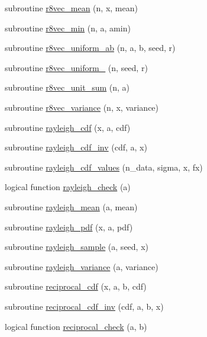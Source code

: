 \begin{DoxyCompactItemize}
\item 
subroutine \hyperlink{subroutines_8f_a3afb0bc60d390433659934e42be314b5}{r8vec\+\_\+mean} (n, x, mean)
\item 
subroutine \hyperlink{subroutines_8f_a5068c55b384e4d8de2b97c2ac9fb9f23}{r8vec\+\_\+min} (n, a, amin)
\item 
subroutine \hyperlink{subroutines_8f_a34c59b6daeb8820b723412d8d9bdf687}{r8vec\+\_\+uniform\+\_\+ab} (n, a, b, seed, r)
\item 
subroutine \hyperlink{subroutines_8f_a5e64b19c036489d0c15f5a2c7ba0e216}{r8vec\+\_\+uniform\+\_} (n, seed, r)
\item 
subroutine \hyperlink{subroutines_8f_aca8f7af53e9c8384405cbe2eecf3deb0}{r8vec\+\_\+unit\+\_\+sum} (n, a)
\item 
subroutine \hyperlink{subroutines_8f_aeac2d8faada0a83b125ddbaa53060f71}{r8vec\+\_\+variance} (n, x, variance)
\item 
subroutine \hyperlink{subroutines_8f_aaa2c63bb728acee27317c0481a5bdbdb}{rayleigh\+\_\+cdf} (x, a, cdf)
\item 
subroutine \hyperlink{subroutines_8f_a6cb29161b358879878553289cb675d94}{rayleigh\+\_\+cdf\+\_\+inv} (cdf, a, x)
\item 
subroutine \hyperlink{subroutines_8f_a638657c28d62e70530a378d9a2920ee2}{rayleigh\+\_\+cdf\+\_\+values} (n\+\_\+data, sigma, x, fx)
\item 
logical function \hyperlink{subroutines_8f_a636b798611edb695a18fcc189bbcfa8b}{rayleigh\+\_\+check} (a)
\item 
subroutine \hyperlink{subroutines_8f_a1913ce88098196a93906c3294a213a42}{rayleigh\+\_\+mean} (a, mean)
\item 
subroutine \hyperlink{subroutines_8f_aed2225b609bc0484d8a878d661ca06f5}{rayleigh\+\_\+pdf} (x, a, pdf)
\item 
subroutine \hyperlink{subroutines_8f_a37c29cebf26c80f5eca6d552281f6e4c}{rayleigh\+\_\+sample} (a, seed, x)
\item 
subroutine \hyperlink{subroutines_8f_a70e2c28fcfac69b8f4a5df3f1472fa15}{rayleigh\+\_\+variance} (a, variance)
\item 
subroutine \hyperlink{subroutines_8f_ae28b3530dc8de971f919080de1b93e80}{reciprocal\+\_\+cdf} (x, a, b, cdf)
\item 
subroutine \hyperlink{subroutines_8f_aa0605b5b606ef51bd36ef48ce4919924}{reciprocal\+\_\+cdf\+\_\+inv} (cdf, a, b, x)
\item 
logical function \hyperlink{subroutines_8f_af51dabb725b02ab97b328de46978219f}{reciprocal\+\_\+check} (a, b)

\end{DoxyCompactItemize}
